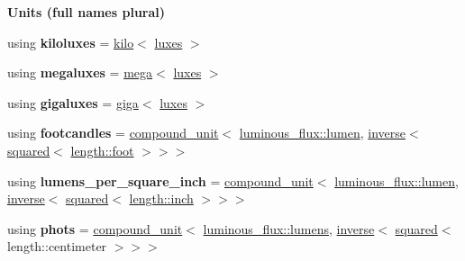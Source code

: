 \begin{Indent}{\bf Units (full names plural)}
\begin{DoxyCompactItemize}
\item 
\hypertarget{namespaceunits_1_1illuminance_a180f47a1605ba8430377838531a42f52}{}using {\bfseries kiloluxes} = \hyperlink{group___unit_manipulators_ga89965a45aaa6689548b9c53858759c5e}{kilo}$<$ \hyperlink{structunits_1_1unit}{luxes} $>$\label{namespaceunits_1_1illuminance_a180f47a1605ba8430377838531a42f52}

\item 
\hypertarget{namespaceunits_1_1illuminance_a512549cfcbbb8b5f3714a1c50b7f01c4}{}using {\bfseries megaluxes} = \hyperlink{group___unit_manipulators_gab1e685fcf4dd9478ed3d688f7af50842}{mega}$<$ \hyperlink{structunits_1_1unit}{luxes} $>$\label{namespaceunits_1_1illuminance_a512549cfcbbb8b5f3714a1c50b7f01c4}

\item 
\hypertarget{namespaceunits_1_1illuminance_a75889e3202d1154e3d7f6fe6132771cb}{}using {\bfseries gigaluxes} = \hyperlink{group___unit_manipulators_ga4595911f659ef61133216da15d61eb07}{giga}$<$ \hyperlink{structunits_1_1unit}{luxes} $>$\label{namespaceunits_1_1illuminance_a75889e3202d1154e3d7f6fe6132771cb}

\item 
\hypertarget{namespaceunits_1_1illuminance_a7ec0b8e305bbe88a1e86f2fd126bb438}{}using {\bfseries footcandles} = \hyperlink{group___unit_types_ga9c3f6f077dc894620e1ed8358442a8f1}{compound\+\_\+unit}$<$ \hyperlink{structunits_1_1unit}{luminous\+\_\+flux\+::lumen}, \hyperlink{group___unit_manipulators_gaacc539ef162e24b260d023d3ff949b57}{inverse}$<$ \hyperlink{group___unit_manipulators_ga636346f7898c35eb98a796bec1d77fb2}{squared}$<$ \hyperlink{structunits_1_1unit}{length\+::foot} $>$$>$$>$\label{namespaceunits_1_1illuminance_a7ec0b8e305bbe88a1e86f2fd126bb438}

\item 
\hypertarget{namespaceunits_1_1illuminance_a83ba1772043721699222a03229694fdd}{}using {\bfseries lumens\+\_\+per\+\_\+square\+\_\+inch} = \hyperlink{group___unit_types_ga9c3f6f077dc894620e1ed8358442a8f1}{compound\+\_\+unit}$<$ \hyperlink{structunits_1_1unit}{luminous\+\_\+flux\+::lumen}, \hyperlink{group___unit_manipulators_gaacc539ef162e24b260d023d3ff949b57}{inverse}$<$ \hyperlink{group___unit_manipulators_ga636346f7898c35eb98a796bec1d77fb2}{squared}$<$ \hyperlink{structunits_1_1unit}{length\+::inch} $>$$>$$>$\label{namespaceunits_1_1illuminance_a83ba1772043721699222a03229694fdd}

\item 
\hypertarget{namespaceunits_1_1illuminance_ac48bc54e625675ec378d183f1d69bcc3}{}using {\bfseries phots} = \hyperlink{group___unit_types_ga9c3f6f077dc894620e1ed8358442a8f1}{compound\+\_\+unit}$<$ \hyperlink{structunits_1_1unit}{luminous\+\_\+flux\+::lumens}, \hyperlink{group___unit_manipulators_gaacc539ef162e24b260d023d3ff949b57}{inverse}$<$ \hyperlink{group___unit_manipulators_ga636346f7898c35eb98a796bec1d77fb2}{squared}$<$ length\+::centimeter $>$$>$$>$\label{namespaceunits_1_1illuminance_ac48bc54e625675ec378d183f1d69bcc3}

\end{DoxyCompactItemize}
\end{Indent}
